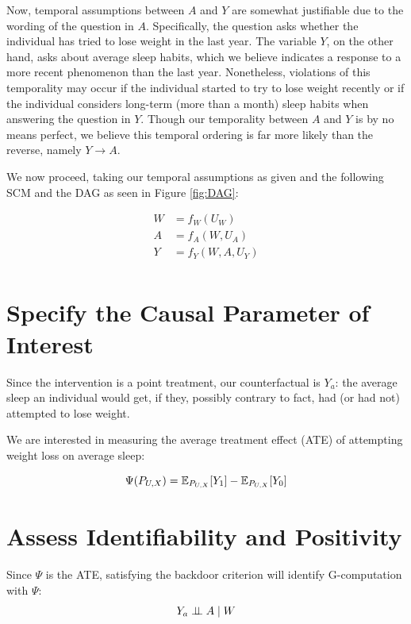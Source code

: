 \documentclass{article}
\begin{document}
Now, temporal assumptions between $A$ and $Y$ are somewhat justifiable due to the wording of the question in $A$. Specifically, the question asks whether the individual has tried to lose weight in the last year. The variable $Y$, on the other hand, asks about average sleep habits, which we believe indicates a response to a more recent phenomenon than the last year. Nonetheless, violations of this temporality may occur if the individual started to try to lose weight recently or if the individual considers long-term (more than a month) sleep habits when answering the question in $Y$. Though our temporality between $A$ and $Y$ is by no means perfect, we believe this temporal ordering is far more likely than the reverse, namely $Y\rightarrow A$. 

We now proceed, taking our temporal assumptions as given and the following SCM and the DAG as seen in Figure \ref{fig:DAG}:

\begin{align*}
W &= f_{W}(U_{W}) \\
A &= f_{A}(W,U_{A}) \\
Y &= f_{Y}(W,A,U_{Y}) \\
\end{align*}


\section{Specify the Causal Parameter of Interest}

Since the intervention is a point treatment, our counterfactual is $Y_{a}$: the average sleep an individual would get, if they, possibly contrary to fact, had (or had not) attempted to lose weight.

We are interested in measuring the average treatment effect (ATE) of attempting weight loss on average sleep:

$$\Psi(P_{U,X}) = \mathbb{E}_{P_{U,X}}[Y_1] - \mathbb{E}_{P_{U,X}}[Y_0]$$

\section{Assess Identifiability and Positivity}
\label{sec:assumptions}

Since $\Psi$ is the ATE, satisfying the backdoor criterion will identify G-computation with $\Psi$:
   $$Y_{a} \perp\hspace{-5pt}\perp A \mid W$$
\end{document}
